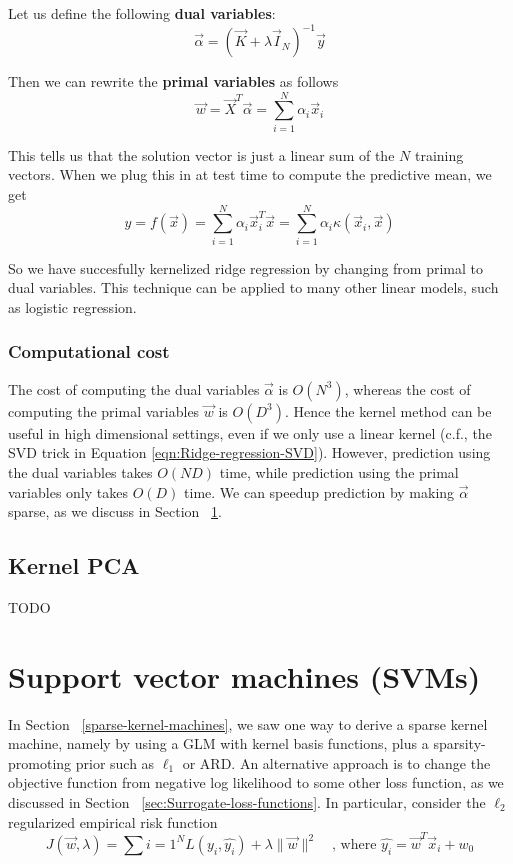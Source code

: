 Let us define the following \textbf{dual variables}:
\begin{equation}
\vec{\alpha}=(\vec{K}+\lambda\vec{I}_N)^{-1}\vec{y}
\end{equation}

Then we can rewrite the \textbf{primal variables} as follows
\begin{equation}
\vec{w}=\vec{X}^T\vec{\alpha}=\sum\limits_{i=1}^N \alpha_i\vec{x}_i
\end{equation}

This tells us that the solution vector is just a linear sum of the $N$ training vectors. When we plug this in at test time to compute the predictive mean, we get
\begin{equation}
y=f(\vec{x})=\sum\limits_{i=1}^N \alpha_i\vec{x}_i^T\vec{x}=\sum\limits_{i=1}^N \alpha_i\kappa(\vec{x}_i,\vec{x})
\end{equation}

So we have succesfully kernelized ridge regression by changing from primal to dual variables. This technique can be applied to many other linear models, such as logistic regression.


\subsubsection{Computational cost}
The cost of computing the dual variables $\vec{\alpha}$ is $O(N^3)$, whereas the cost of computing the primal variables $\vec{w}$ is $O(D^3)$. Hence the kernel method can be useful in high dimensional settings, even if we only use a linear kernel (c.f., the SVD trick in Equation \eqref{eqn:Ridge-regression-SVD}). However, prediction using the dual variables takes $O(ND)$ time, while prediction using the primal variables only takes $O(D)$ time. We can speedup prediction by making $\vec{\alpha}$ sparse, as we discuss in Section ~\ref{sec:SVMs}.


\subsection{Kernel PCA}
TODO


\section{Support vector machines (SVMs)}
\label{sec:SVMs}
In Section ~\ref{sparse-kernel-machines}, we saw one way to derive a sparse kernel machine, namely by using a GLM with kernel basis functions, plus a sparsity-promoting prior such as $\ell_1$ or ARD. An alternative approach is to change the objective function from negative log likelihood to some other loss function, as we discussed in Section ~\ref{sec:Surrogate-loss-functions}. In particular, consider the $\ell_2$ regularized empirical risk function
\begin{equation}
J(\vec{w}, \lambda)=\sum\limits{i=1}^N L(y_i, \hat{y_i})+\lambda\lVert\vec{w}\rVert^2 \quad \text{, where } \hat{y_i}=\vec{w}^T\vec{x}_i+w_0
\end{equation}

